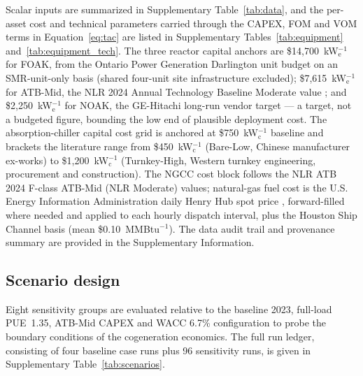 \documentclass[sn-vancouver,Numbered]{sn-jnl}%
\begin{document}
Scalar inputs are summarized in Supplementary Table~\ref{tab:data}, and the per-asset cost and technical parameters carried through the CAPEX, FOM and VOM terms in Equation~\eqref{eq:tac} are listed in Supplementary Tables~\ref{tab:equipment} and~\ref{tab:equipment_tech}. The three reactor capital anchors are \$14{,}700~kW$_\mathrm{e}^{-1}$ for FOAK, from the Ontario Power Generation Darlington unit budget on an SMR-unit-only basis (shared four-unit site infrastructure excluded); \$7{,}615~kW$_\mathrm{e}^{-1}$ for ATB-Mid, the NLR 2024 Annual Technology Baseline Moderate value \citep{atb2024nuclear}; and \$2{,}250~kW$_\mathrm{e}^{-1}$ for NOAK, the GE-Hitachi long-run vendor target — a target, not a budgeted figure, bounding the low end of plausible deployment cost. The absorption-chiller capital cost grid is anchored at \$750~kW$_\mathrm{c}^{-1}$ baseline and brackets the literature range from \$450~kW$_\mathrm{c}^{-1}$ (Bare-Low, Chinese manufacturer ex-works) to \$1{,}200~kW$_\mathrm{c}^{-1}$ (Turnkey-High, Western turnkey engineering, procurement and construction). The NGCC cost block follows the NLR ATB 2024 F-class ATB-Mid (NLR Moderate) values; natural-gas fuel cost is the U.S. Energy Information Administration daily Henry Hub spot price \citep{eiaHenryHub}, forward-filled where needed and applied to each hourly dispatch interval, plus the Houston Ship Channel basis (mean \$0.10~MMBtu$^{-1}$). The data audit trail and provenance summary are provided in the Supplementary Information.

\subsection{Scenario design}
\label{sec:methods:scenarios}

Eight sensitivity groups are evaluated relative to the baseline 2023, full-load PUE~1.35, ATB-Mid CAPEX and WACC 6.7\% configuration to probe the boundary conditions of the cogeneration economics. The full run ledger, consisting of four baseline case runs plus 96 sensitivity runs, is given in Supplementary Table~\ref{tab:scenarios}.
\end{document}
